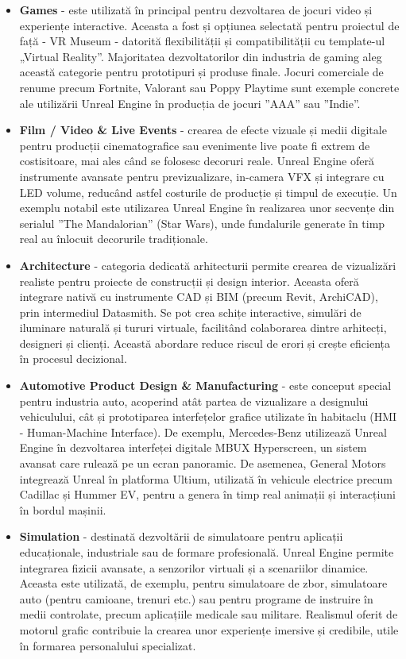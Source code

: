 \begin{itemize}
\item \textbf{Games} - este utilizată în principal pentru dezvoltarea de jocuri video și experiențe interactive. Aceasta a fost și opțiunea selectată pentru proiectul de față - VR Museum - datorită flexibilității și compatibilității cu template-ul „Virtual Reality”. Majoritatea dezvoltatorilor din industria de gaming aleg această categorie pentru prototipuri și produse finale. Jocuri comerciale de renume precum Fortnite, Valorant sau Poppy Playtime sunt exemple concrete ale utilizării Unreal Engine în producția de jocuri ”AAA” sau ”Indie”.
\item \textbf{Film / Video \& Live Events} - crearea de efecte vizuale și medii digitale pentru producții cinematografice sau evenimente live poate fi extrem de costisitoare, mai ales când se folosesc decoruri reale. Unreal Engine oferă instrumente avansate pentru previzualizare, in-camera VFX și integrare cu LED volume, reducând astfel costurile de producție și timpul de execuție. Un exemplu notabil este utilizarea Unreal Engine în realizarea unor secvențe din serialul ”The Mandalorian” (Star Wars), unde fundalurile generate în timp real au înlocuit decorurile tradiționale.
\item \textbf{Architecture} - categoria dedicată arhitecturii permite crearea de vizualizări realiste pentru proiecte de construcții și design interior. Aceasta oferă integrare nativă cu instrumente CAD și BIM (precum Revit, ArchiCAD), prin intermediul Datasmith. Se pot crea schițe interactive, simulări de iluminare naturală și tururi virtuale, facilitând colaborarea dintre arhitecți, designeri și clienți. Această abordare reduce riscul de erori și crește eficiența în procesul decizional.
\item \textbf{Automotive Product Design \& Manufacturing} - este conceput special pentru industria auto, acoperind atât partea de vizualizare a designului vehiculului, cât și prototiparea interfețelor grafice utilizate în habitaclu (HMI - Human-Machine Interface). De exemplu, Mercedes-Benz utilizează Unreal Engine în dezvoltarea interfeței digitale MBUX Hyperscreen, un sistem avansat care rulează pe un ecran panoramic. De asemenea, General Motors integrează Unreal în platforma Ultium, utilizată în vehicule electrice precum Cadillac și Hummer EV, pentru a genera în timp real animații și interacțiuni în bordul mașinii.
\item \textbf{Simulation} - destinată dezvoltării de simulatoare pentru aplicații educaționale, industriale sau de formare profesională. Unreal Engine permite integrarea fizicii avansate, a senzorilor virtuali și a scenariilor dinamice. Aceasta este utilizată, de exemplu, pentru simulatoare de zbor, simulatoare auto (pentru camioane, trenuri etc.) sau pentru programe de instruire în medii controlate, precum aplicațiile medicale sau militare. Realismul oferit de motorul grafic contribuie la crearea unor experiențe imersive și credibile, utile în formarea personalului specializat.

\end{itemize}

